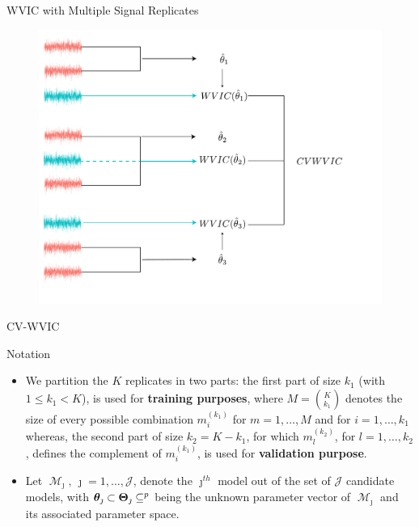 \documentclass[envcountsect,usenames,dvipsnames]{beamer}
\DeclareMathOperator*{\model}{\mathcal{M}}
\theoremstyle{mystyle}
\begin{document}
\begin{frame}{WVIC with Multiple Signal Replicates}
    \begin{figure}
        \centering
        \includegraphics[scale = 0.22]{Images/cv_wvic-1.pdf}
    \label{fig:appshiny}
    \end{figure}
\end{frame}

\begin{frame}{CV-WVIC}
    \begin{block}{Notation}
    \begin{itemize}
        \item We partition the $K$ replicates in two parts: the first part of size $k_1$ (with $1 \leq k_1 < K$), is used for {\color{beamer@myorange}\textbf{training purposes}},  where $M = {K\choose k_1}$ denotes the size of every possible combination $m^{(k_1)}_{i}$  for  $m = 1, \ldots, M$ and for $i = 1, \ldots, k_1$ whereas, the second part of size $k_2 = K - k_1$, for which $m^{(k_2)}_{l}$, for $l = 1, \ldots, k_2$,  defines the complement of $m^{(k_1)}_{i}$, is used for {\color{beamer@myorange}\textbf{validation purpose}}.
        \item Let $\model_{\jmath}, \, \jmath = 1, \hdots, \mathcal{J}$, denote the $\jmath^{th}$ model out of the set of $\mathcal{J}$ candidate models, with $\bm{\theta}_{\jmath} \subset \bm{\Theta}_{\jmath} \subseteq \real^{p}$ being the unknown parameter vector of $\model_{\jmath}$ and its associated parameter space.
    \end{itemize}

    \end{block}
\end{frame}
\end{document}

